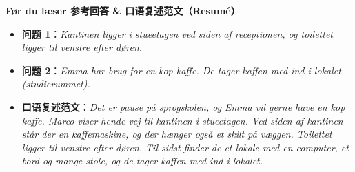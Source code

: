 \begin{answerbox}
\textbf{Før du læser 参考回答 \& 口语复述范文（Resumé）}
\begin{itemize}
  \item \textbf{问题 1}：\textit{Kantinen ligger i stueetagen ved siden af receptionen, og toilettet ligger til venstre efter døren.}
  \item \textbf{问题 2}：\textit{Emma har brug for en kop kaffe. De tager kaffen med ind i lokalet (studierummet).}
  \item \textbf{口语复述范文}：\textit{Det er pause på sprogskolen, og Emma vil gerne have en kop kaffe. Marco viser hende vej til kantinen i stueetagen. Ved siden af kantinen står der en kaffemaskine, og der hænger også et skilt på væggen. Toilettet ligger til venstre efter døren. Til sidst finder de et lokale med en computer, et bord og mange stole, og de tager kaffen med ind i lokalet.}
\end{itemize}
\end{answerbox}

